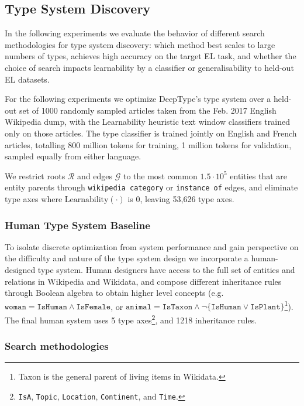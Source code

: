 \documentclass[letterpaper]{article}
\begin{document}
\subsection{Type System Discovery}
In the following experiments we evaluate the behavior of different search methodologies for type system discovery: which method best scales to large numbers of types, achieves high accuracy on the target EL task, and whether the choice of search impacts learnability by a classifier or generalisability to held-out EL datasets.

For the following experiments we optimize DeepType's type system over a held-out set of 1000 randomly sampled articles taken from the Feb. 2017 English Wikipedia dump, with the Learnability heuristic text window classifiers trained only on those articles. The type classifier is trained jointly on English and French articles, totalling 800 million tokens for training, 1 million tokens for validation, sampled equally from either language.


We restrict roots $\mathcal{R}$ and edges $\mathcal{G}$ to the most common $1.5\cdot10^5$ entities that are entity parents through \texttt{wikipedia category} or \texttt{instance of} edges, and eliminate type axes where $\mathrm{Learnability}(\cdot)$ is 0, leaving 53,626 type axes. 

\subsubsection{Human Type System Baseline}
\label{section:humandesign}
To isolate discrete optimization from system performance and gain perspective on the difficulty and nature of the type system design we incorporate a human-designed type system. Human designers have access to the full set of entities and relations in Wikipedia and Wikidata, and compose different inheritance rules through Boolean algebra to obtain higher level concepts (e.g. $\texttt{woman} = \texttt{IsHuman} \land \texttt{IsFemale}$, or $\texttt{animal} = \texttt{IsTaxon} \land \neg \{\texttt{IsHuman} \lor \texttt{IsPlant}\}$\footnote{Taxon is the general parent of living items in Wikidata.}). The final human system uses 5 type axes\footnote{\texttt{IsA}, \texttt{Topic}, \texttt{Location}, \texttt{Continent}, and \texttt{Time}.}, and 1218 inheritance rules.

\subsubsection{Search methodologies}
\end{document}
